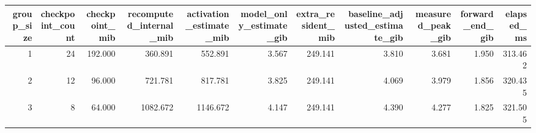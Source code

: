 \begin{tabular}{rrrrrrrrrrr}
\toprule
group\_size & checkpoint\_count & checkpoint\_mib & recomputed\_internal\_mib & activation\_estimate\_mib & model\_only\_estimate\_gib & extra\_resident\_mib & baseline\_adjusted\_estimate\_gib & measured\_peak\_gib & forward\_end\_gib & elapsed\_ms \\
\midrule
1 & 24 & 192.000 & 360.891 & 552.891 & 3.567 & 249.141 & 3.810 & 3.681 & 1.950 & 313.462 \\
2 & 12 & 96.000 & 721.781 & 817.781 & 3.825 & 249.141 & 4.069 & 3.979 & 1.856 & 320.435 \\
3 & 8 & 64.000 & 1082.672 & 1146.672 & 4.147 & 249.141 & 4.390 & 4.277 & 1.825 & 321.505 \\
\bottomrule
\end{tabular}
